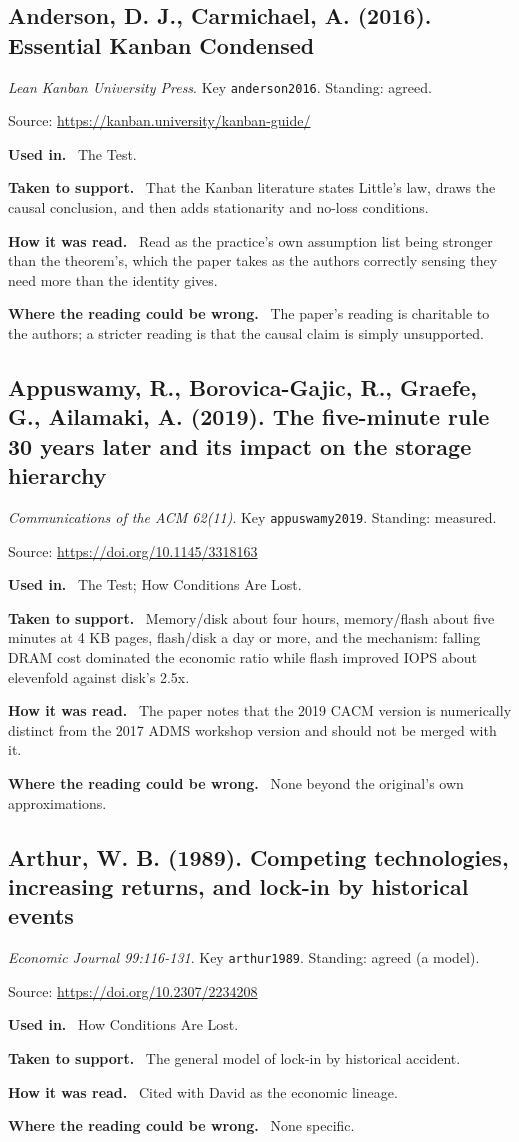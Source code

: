 \documentclass[11pt,oneside]{article}
\newcommand{\field}[1]{\par\noindent\textbf{\color{accent}#1.}\ }
\begin{document}
\hypertarget{src:anderson2016}{}
\subsection*{Anderson, D. J., Carmichael, A. (2016). Essential Kanban Condensed}
\noindent\small\emph{Lean Kanban University Press}. Key \texttt{anderson2016}. Standing: agreed.
\par\noindent\small Source: \url{https://kanban.university/kanban-guide/}
\normalsize
\field{Used in} The Test.
\field{Taken to support} That the Kanban literature states Little's law, draws the causal conclusion, and then adds stationarity and no-loss conditions.
\field{How it was read} Read as the practice's own assumption list being stronger than the theorem's, which the paper takes as the authors correctly sensing they need more than the identity gives.
\field{Where the reading could be wrong} The paper's reading is charitable to the authors; a stricter reading is that the causal claim is simply unsupported.

\hypertarget{src:appuswamy2019}{}
\subsection*{Appuswamy, R., Borovica-Gajic, R., Graefe, G., Ailamaki, A. (2019). The five-minute rule 30 years later and its impact on the storage hierarchy}
\noindent\small\emph{Communications of the ACM 62(11)}. Key \texttt{appuswamy2019}. Standing: measured.
\par\noindent\small Source: \url{https://doi.org/10.1145/3318163}
\normalsize
\field{Used in} The Test; How Conditions Are Lost.
\field{Taken to support} Memory/disk about four hours, memory/flash about five minutes at 4 KB pages, flash/disk a day or more, and the mechanism: falling DRAM cost dominated the economic ratio while flash improved IOPS about elevenfold against disk's 2.5x.
\field{How it was read} The paper notes that the 2019 CACM version is numerically distinct from the 2017 ADMS workshop version and should not be merged with it.
\field{Where the reading could be wrong} None beyond the original's own approximations.

\hypertarget{src:arthur1989}{}
\subsection*{Arthur, W. B. (1989). Competing technologies, increasing returns, and lock-in by historical events}
\noindent\small\emph{Economic Journal 99:116-131}. Key \texttt{arthur1989}. Standing: agreed (a model).
\par\noindent\small Source: \url{https://doi.org/10.2307/2234208}
\normalsize
\field{Used in} How Conditions Are Lost.
\field{Taken to support} The general model of lock-in by historical accident.
\field{How it was read} Cited with David as the economic lineage.
\field{Where the reading could be wrong} None specific.
\end{document}

